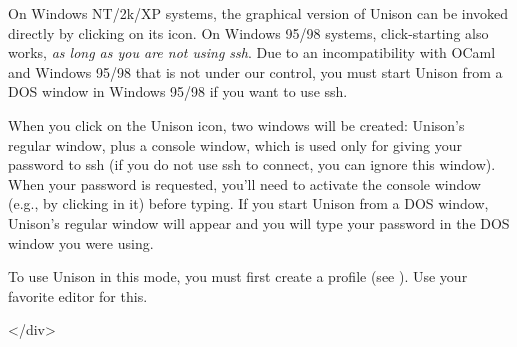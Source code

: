 \documentclass{article}
\begin{document}

On Windows NT/2k/XP systems, the graphical version of Unison can be
invoked directly by clicking on its icon.  On Windows 95/98 systems,
click-starting also works, {\em as long as you are not using ssh}.
Due to an incompatibility with OCaml and Windows 95/98 that is not
under our control, you must start Unison from a DOS window in Windows
95/98 if you want to use ssh.

When you click on the Unison icon, two windows will be created:
Unison's regular window, plus a console window, which is used only for
giving your password to ssh (if you do not use ssh to connect, you can
ignore this window).  When your password is requested, you'll need to
activate the console window (e.g., by clicking in it) before typing.
If you start Unison from a DOS window, Unison's regular window will
appear and you will type your password in the DOS window you were
using.

To use Unison in this mode, you must first create a profile (see
).  Use your favorite editor for this.


\appendix




\iftextversion
{}
\fi

\ifhevea\begin{rawhtml}</div>\end{rawhtml}\fi
\end{document}
